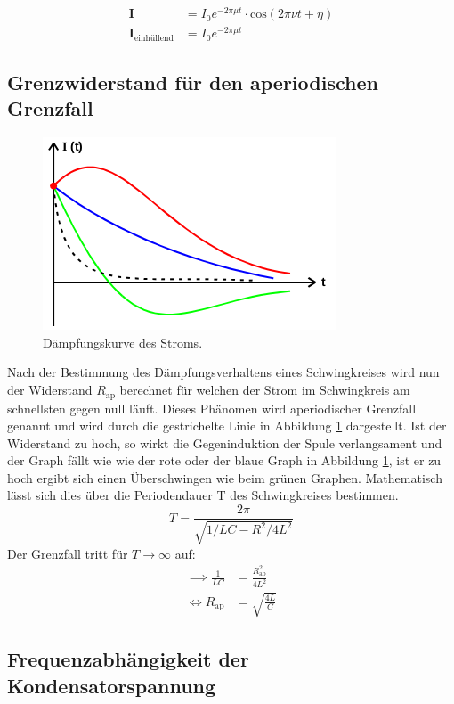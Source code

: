 \begin{align}
  \symbf{I} &= I_0 e^{-2\pi\mu t}
  \cdot\text{cos}\left(2\pi\nu t+\eta\right)\\
  \symbf{I}_\text{einhüllend} &= I_0 e^{-2\pi\mu t}
  \label{eqn:einhuellend}
\end{align}

\subsection{Grenzwiderstand für den aperiodischen Grenzfall}

\begin{figure}[H]
  \centering
  \includegraphics{content/images/dia2.png}
  \caption{Dämpfungskurve des Stroms.}
  \label{fig:aperiodisch}
\end{figure}

Nach der Bestimmung des Dämpfungsverhaltens eines Schwingkreises
wird nun der Widerstand $R_\text{ap}$ berechnet für welchen der
Strom im Schwingkreis am schnellsten gegen null läuft. Dieses
Phänomen wird aperiodischer Grenzfall genannt und wird durch
die gestrichelte Linie in Abbildung \ref{fig:aperiodisch}
dargestellt. Ist der Widerstand zu hoch, so wirkt die Gegeninduktion der
Spule verlangsament und der Graph fällt wie wie der rote oder der
blaue Graph in Abbildung \ref{fig:aperiodisch}, ist er zu hoch
ergibt sich einen Überschwingen wie beim grünen Graphen.
Mathematisch lässt sich dies über die Periodendauer T des
Schwingkreises bestimmen.
\begin{equation}
  T = \frac{2\pi}{\sqrt{1/LC-R^2/4L^2}}
\end{equation}
Der Grenzfall tritt für $T\to\infty$ auf:
\begin{align}
  \implies \frac{1}{LC}&=\frac{R_\text{ap}^2}{4L^2}\\
  \iff R_\text{ap} &=\sqrt{\frac{4L}{C}}
\end{align}

\subsection{Frequenzabhängigkeit der Kondensatorspannung}

